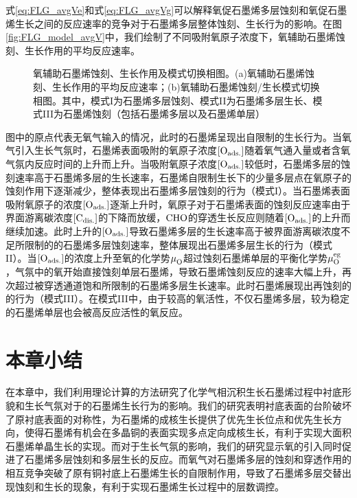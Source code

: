 式\ref{eq:FLG_avgVe}和式\ref{eq:FLG_avgVg}可以解释氧促石墨烯多层蚀刻和氧促石墨烯生长之间的反应速率的竞争对于石墨烯多层整体蚀刻、生长行为的影响。在图\ref{fig:FLG_model_avgV}中，我们绘制了不同吸附氧原子浓度下，氧辅助石墨烯蚀刻、生长作用的平均反应速率。

\begin{figure}[htb]
    \caption{氧辅助石墨烯蚀刻、生长作用及模式切换相图。(a)氧辅助石墨烯蚀刻、生长作用的平均反应速率；(b)氧辅助石墨烯蚀刻/生长模式切换相图。其中，模式I为石墨烯多层蚀刻、模式II为石墨烯多层生长、模式III为石墨烯蚀刻（包括石墨烯多层以及石墨烯单层）}
    \label{fig:FLG_model}
\end{figure}

图中的原点代表无氧气输入的情况，此时的石墨烯呈现出自限制的生长行为。当氧气引入生长气氛时，石墨烯表面吸附的氧原子浓度$\rm{\left[O_{ads.}\right]} \it$随着氧气通入量或者含氧气氛内反应时间的上升而上升。当吸附氧原子浓度$\rm{\left[O_{ads.}\right]} \it$较低时，石墨烯多层的蚀刻速率高于石墨烯多层的生长速率，石墨烯自限制生长下的少量多层点在氧原子的蚀刻作用下逐渐减少，整体表现出石墨烯多层蚀刻的行为（模式I）。当石墨烯表面吸附氧原子的浓度$\rm{\left[O_{ads.}\right]} \it$逐渐上升时，氧原子对于石墨烯表面的蚀刻反应速率由于界面游离碳浓度$\rm{\left[C_{dis.}\right]} \it$的下降而放缓，$\cemb{CHO}$的穿透生长反应则随着$\rm{\left[O_{ads.}\right]} \it$的上升而继续加速。此时上升的$\rm{\left[O_{ads.}\right]} \it$导致石墨烯多层的生长速率高于被界面游离碳浓度不足所限制的的石墨烯多层蚀刻速率，整体展现出石墨烯多层生长的行为（模式II）。当$\rm{\left[O_{ads.}\right]} \it$的浓度上升至氧的化学势$\mu_{\rm O}^{\rm } \it$超过蚀刻石墨烯单层的平衡化学势$\mu_{\rm O}^{\rm eg} \it$，气氛中的氧开始直接蚀刻单层石墨烯，导致石墨烯蚀刻反应的速率大幅上升，再次超过被穿透通道饱和所限制的石墨烯多层生长速率。此时石墨烯展现出再蚀刻的的行为（模式III）。在模式III中，由于较高的氧活性，不仅石墨烯多层，较为稳定的石墨烯单层也会被高反应活性的氧反应。

\section{本章小结}
在本章中，我们利用理论计算的方法研究了化学气相沉积生长石墨烯过程中衬底形貌和生长气氛对于的石墨烯生长行为的影响。我们的研究表明衬底表面的台阶破坏了原衬底表面的对称性，为石墨烯的成核生长提供了优先生长位点和优先生长方向，使得石墨烯有机会在多晶铜的表面实现多点定向成核生长，有利于实现大面积石墨烯单晶生长的实现。而对于生长气氛的影响，我们的研究显示氧的引入同时促进了石墨烯多层蚀刻和多层生长的反应。而氧气对石墨烯多层的蚀刻和穿透作用的相互竞争突破了原有铜衬底上石墨烯生长的自限制作用，导致了石墨烯多层交替出现蚀刻和生长的现象，有利于实现石墨烯生长过程中的层数调控。
